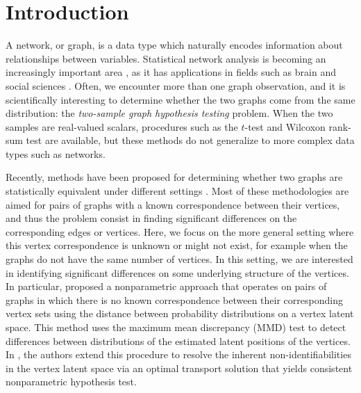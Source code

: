 \section{Introduction}\label{sec:introduction}
A network, or graph, is a data type which naturally encodes information about relationships between variables.
Statistical network analysis is becoming an increasingly important area \cite{goldenberg2010survey}, as it has applications in fields such as brain \cite{bullmore2009complex} and social sciences \cite{wasserman1994social}. Often, we encounter more than one graph observation, and it is  scientifically interesting to determine whether the two graphs come from the same distribution: the \textit{two-sample graph hypothesis testing} problem. 
When the two samples are real-valued scalars, procedures such as the $t$-test and Wilcoxon rank-sum test are available, but these methods do not generalize to more complex data types such as networks.

Recently, methods have been proposed for determining whether two graphs are statistically equivalent under different settings \cite{semipar, omni, tang2014nonparametric, graph-comparison-same-1, graph-comparison-same-3, graph-comparison-same-4, graph-comparison-other-1, graph-comparison-other-2, graph-comparison-other-5, graph-comparison-other-8, graph-comparison-other-9}.
Most of these methodologies are aimed for pairs of graphs with a known correspondence between their vertices, and thus the problem consist in finding significant differences on the corresponding edges or vertices. 
Here, we focus on the more general setting where this vertex correspondence is unknown or might not exist, for example when the graphs do not have the same number of vertices. 
In this setting, we are interested in identifying significant differences on some underlying structure of the vertices.
In particular, \cite{tang2014nonparametric} proposed a nonparametric approach that operates on pairs of graphs in which there is no known correspondence between their corresponding vertex sets using the distance between probability distributions on a vertex latent space. This method uses the maximum mean discrepancy (MMD) test to detect differences between  distributions of the estimated latent positions of the vertices.
In \cite{agterberg2020nonparametric}, the authors extend this procedure to resolve the inherent non-identifiabilities in the vertex latent space via an optimal transport solution that yields consistent nonparametric hypothesis test.


